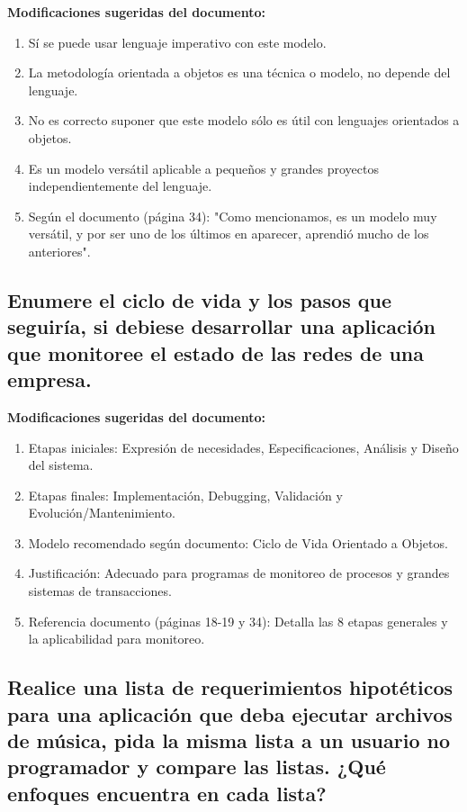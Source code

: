 \documentclass{article}
\begin{document}
\begin{framed}
\noindent\textbf{Modificaciones sugeridas del documento:}
\begin{enumerate}
    \item Sí se puede usar lenguaje imperativo con este modelo.
    \item La metodología orientada a objetos es una técnica o modelo, no depende del lenguaje.
    \item No es correcto suponer que este modelo sólo es útil con lenguajes orientados a objetos.
    \item Es un modelo versátil aplicable a pequeños y grandes proyectos independientemente del lenguaje.
    \item Según el documento (página 34): "Como mencionamos, es un modelo muy versátil, y por ser uno de los últimos en aparecer, aprendió mucho de los anteriores".
\end{enumerate}
\end{framed}

\subsection{Enumere el ciclo de vida y los pasos que seguiría, si debiese desarrollar una aplicación que monitoree el estado de las redes de una empresa.}

\begin{framed}
\noindent\textbf{Modificaciones sugeridas del documento:}
\begin{enumerate}
    \item Etapas iniciales: Expresión de necesidades, Especificaciones, Análisis y Diseño del sistema.
    \item Etapas finales: Implementación, Debugging, Validación y Evolución/Mantenimiento.
    \item Modelo recomendado según documento: Ciclo de Vida Orientado a Objetos.
    \item Justificación: Adecuado para programas de monitoreo de procesos y grandes sistemas de transacciones.
    \item Referencia documento (páginas 18-19 y 34): Detalla las 8 etapas generales y la aplicabilidad para monitoreo.
\end{enumerate}
\end{framed}

\subsection{Realice una lista de requerimientos hipotéticos para una aplicación que deba ejecutar archivos de música, pida la misma lista a un usuario no programador y compare las listas. ¿Qué enfoques encuentra en cada lista?}
\end{document}
